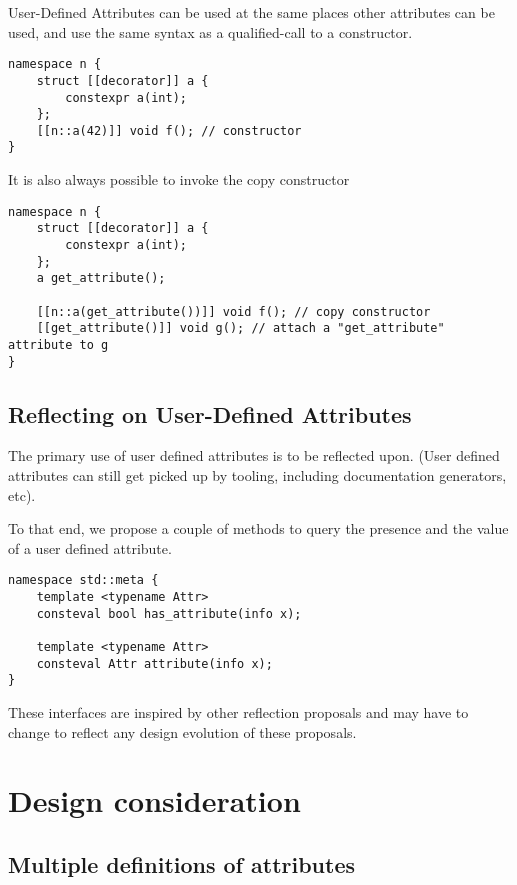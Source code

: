 \documentclass{wg21}
\begin{document}
User-Defined Attributes can be used at the same places other attributes can be used,
and use the same syntax as a qualified-call to a constructor.

\begin{verbatim}
namespace n {
    struct [[decorator]] a {
        constexpr a(int);
    };
    [[n::a(42)]] void f(); // constructor
}
\end{verbatim}

It is also always possible to invoke the copy constructor


\begin{verbatim}
namespace n {
    struct [[decorator]] a {
        constexpr a(int);
    };
    a get_attribute();
    
    [[n::a(get_attribute())]] void f(); // copy constructor
    [[get_attribute()]] void g(); // attach a "get_attribute" attribute to g
}
\end{verbatim}


\subsection{Reflecting on User-Defined Attributes}

The primary use of user defined attributes is to be reflected upon.
(User defined attributes can still get picked up by tooling, including documentation generators, etc).

To that end, we propose a couple of methods to query the presence and the value of a user defined attribute.

\begin{verbatim}
namespace std::meta {
    template <typename Attr>
    consteval bool has_attribute(info x);
    
    template <typename Attr>
    consteval Attr attribute(info x);
}

\end{verbatim}

\begin{note}
These interfaces are inspired by other reflection proposals and may have to change to reflect any design evolution of these proposals.
\end{note}


\section{Design consideration}

\subsection{Multiple definitions of attributes}
\end{document}

